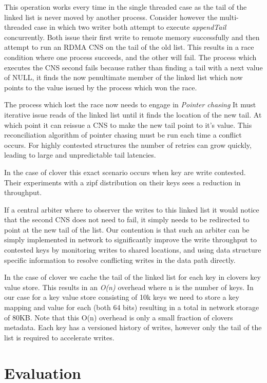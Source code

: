 This operation works every time in the single threaded case as the
tail of the linked list is never moved by another process. Consider
however the multi-threaded case in which two writer both attempt to
execute \textit{appendTail} concurrently. Both issue their first write
to remote memory successfully and then attempt to run an RDMA CNS on
the tail of the old list. This results in a race condition where one
process succeeds, and the other will fail. The process which executes
the CNS second fails because rather than finding a tail with a next
value of NULL, it finds the now penultimate member of the linked list
which now points to the value issued by the process which won the
race. 

The process which lost the race now needs to engage in \textit{Pointer
chasing} It must iterative issue reads of the linked list until it
finds the location of the new tail. At which point it can reissue a
CNS to make the new tail point to it's value. This reconciliation
algorithm of pointer chasing must be run each time a conflict occurs.
For highly contested structures the number of retries can grow
quickly, leading to large and unpredictable tail latencies.

In the case of clover this exact scenario occurs when key are write
contested. Their experiments with a zipf distribution on their keys
sees a  reduction in throughput.

If a central arbiter where to observer the writes to this linked list
it would notice that the second CNS does not need to fail, it simply
needs to be redirected to point at the new tail of the list. Our
contention is that such an arbiter can be simply implemented in network
to significantly improve the write throughput to contested keys by
monitoring writes to shared locations, and using data structure
specific information to resolve conflicting writes in the data path
directly.

In the case of clover we cache the tail of the linked list for each
key in clovers key value store. This results in an \textit{O(n)}
overhead where n is the number of keys. In our case for a key value
store consisting of 10k keys we need to store a key mapping and value
for each (both 64 bits) resulting in a total in network storage of
80KB. Note that this O(n) overhead is only a small fraction of clovers
metadata. Each key has a versioned history of writes, however only the
tail of the list is required to accelerate writes.

\section{Evaluation}

